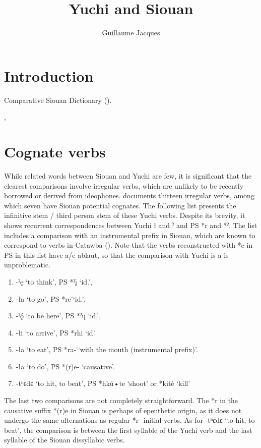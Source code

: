 \documentclass[oneside,a4paper,11pt]{article}
\newcommand{\ipa}[1]{{\phon#1}} %
\begin{document}
 
\title{Yuchi and Siouan}
\author{Guillaume Jacques}
\maketitle

\section{Introduction}
Comparative Siouan Dictionary (\citealt{rankin15csd}). 


\citet{helmbrecht06hocak}, \citet{ullrich08}
\section{Cognate verbs}

While related words between Siouan and Yuchi are few, it is significant that the clearest comparisons involve irregular verbs, which are unlikely to be recently borrowed or derived from ideophones. \citet[334-5]{wagner38yuchi} documents thirteen irregular verbs, among which seven have Siouan potential cognates. The following list presents the infinitive stem / third person stem of these Yuchi verbs. Despite its brevity, it shows recurrent correspondences between Yuchi \ipa{ł} and \ipa{ˀ} and PS *\ipa{r} and *\ipa{ˀ}. The list includes a comparison with an instrumental prefix in Siouan, which are known to correspond to verbs in Catawba (\citealt{rankin98proto}). Note that the verbs reconstructed with *\ipa{e} in PS in this list have \ipa{a}/\ipa{e} ablaut, so that the comparison with Yuchi is \ipa{a} is unproblematic.

\begin{enumerate}
\item   \ipa{-ˀę} ‘to think’,  PS *\ipa{ˀį} ‘id.’, 
\item \ipa{-ła} ‘to go’,  PS *\ipa{re}˙‘id.’, 
\item \ipa{-ˀǫ́} ‘to be here’,  PS *\ipa{ˀų} ‘id.’, 
\item \ipa{-łi} ‘to arrive’,  PS *\ipa{rhi} ‘id’. 
\item \ipa{-ła} ‘to eat’,  PS *\ipa{ra-}˙‘with the mouth (instrumental prefix)’.
\item \ipa{-ła} ‘to do’, PS *\ipa{(r)e-} `causative'.
\item \ipa{-tʰɛdɛ} ‘to hit, to beat’,  PS *\ipa{hkú•te} `shoot' or *\ipa{kité} `kill'
\end{enumerate}  
The last two comparisons are not completely straightforward. The *\ipa{r} in the causative suffix *\ipa{(r)e} in Siouan is perhaps of epenthetic origin, as it does not undergo the same alternations as regular *\ipa{r-} initial verbs. As for \ipa{-tʰɛdɛ} ‘to hit, to beat', the comparison is between the first syllable of the Yuchi verb and the last syllable of the Siouan dissyllabic verbs.
\end{document}
